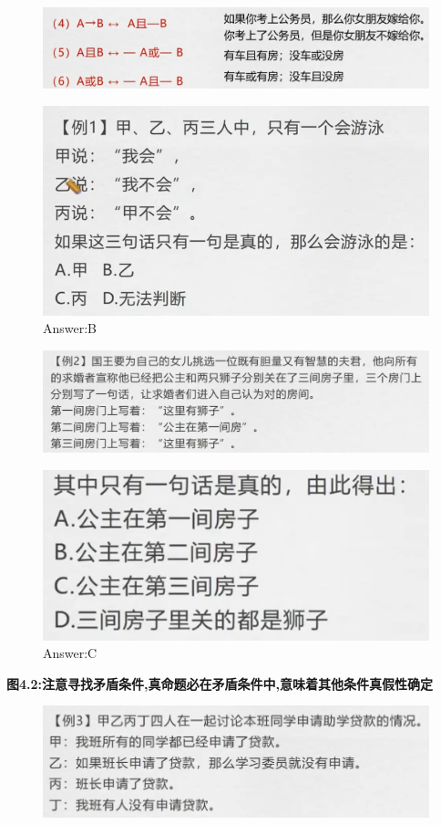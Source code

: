 \documentclass{article}
\numberwithin{equation}{section}						%
\numberwithin{figure}{section}							%
\begin{document}
\begin{sloppypar}
\begin{figure}[H]
     \centering
     \includegraphics[width=0.6\linewidth]{166.png}
\end{figure}


\begin{figure}[H]
     \centering
     \includegraphics[width=0.45\linewidth]{167.png}
		\caption{Answer:B}
\end{figure}


\begin{figure}[H]
     \centering
     \includegraphics[width=0.6\linewidth]{168.png}
\end{figure}


\begin{figure}[H]
     \centering
     \includegraphics[width=0.35\linewidth]{169.png}
		\caption{Answer:C}
\end{figure}


\textbf{图4.2:注意寻找矛盾条件,真命题必在矛盾条件中,意味着其他条件真假性确定}


\begin{figure}[H]
     \centering
     \includegraphics[width=0.6\linewidth]{170.png}
\end{figure}


\end{sloppypar}
\end{document}
